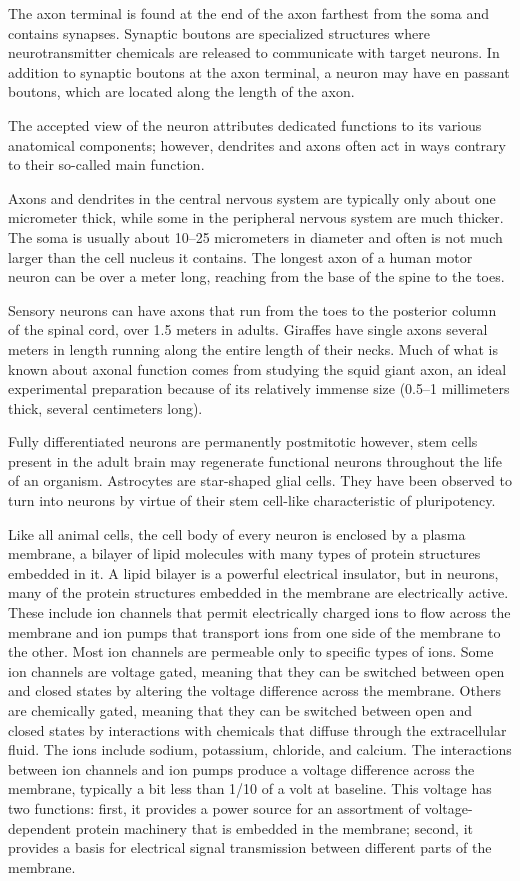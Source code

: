 The axon terminal is found at the end of the axon farthest from the soma and contains synapses. Synaptic boutons are specialized structures where neurotransmitter chemicals are released to communicate with target neurons. In addition to synaptic boutons at the axon terminal, a neuron may have en passant boutons, which are located along the length of the axon.

The accepted view of the neuron attributes dedicated functions to its various anatomical components; however, dendrites and axons often act in ways contrary to their so-called main function.

Axons and dendrites in the central nervous system are typically only about one micrometer thick, while some in the peripheral nervous system are much thicker. The soma is usually about 10--25 micrometers in diameter and often is not much larger than the cell nucleus it contains. The longest axon of a human motor neuron can be over a meter long, reaching from the base of the spine to the toes.

Sensory neurons can have axons that run from the toes to the posterior column of the spinal cord, over 1.5 meters in adults. Giraffes have single axons several meters in length running along the entire length of their necks. Much of what is known about axonal function comes from studying the squid giant axon, an ideal experimental preparation because of its relatively immense size (0.5--1 millimeters thick, several centimeters long).

Fully differentiated neurons are permanently postmitotic however, stem cells present in the adult brain may regenerate functional neurons throughout the life of an organism. Astrocytes are star-shaped glial cells. They have been observed to turn into neurons by virtue of their stem cell-like characteristic of pluripotency.

Like all animal cells, the cell body of every neuron is enclosed by a plasma membrane, a bilayer of lipid molecules with many types of protein structures embedded in it. A lipid bilayer is a powerful electrical insulator, but in neurons, many of the protein structures embedded in the membrane are electrically active. These include ion channels that permit electrically charged ions to flow across the membrane and ion pumps that transport ions from one side of the membrane to the other. Most ion channels are permeable only to specific types of ions. Some ion channels are voltage gated, meaning that they can be switched between open and closed states by altering the voltage difference across the membrane. Others are chemically gated, meaning that they can be switched between open and closed states by interactions with chemicals that diffuse through the extracellular fluid. The ions include sodium, potassium, chloride, and calcium. The interactions between ion channels and ion pumps produce a voltage difference across the membrane, typically a bit less than 1/10 of a volt at baseline. This voltage has two functions: first, it provides a power source for an assortment of voltage-dependent protein machinery that is embedded in the membrane; second, it provides a basis for electrical signal transmission between different parts of the membrane.

